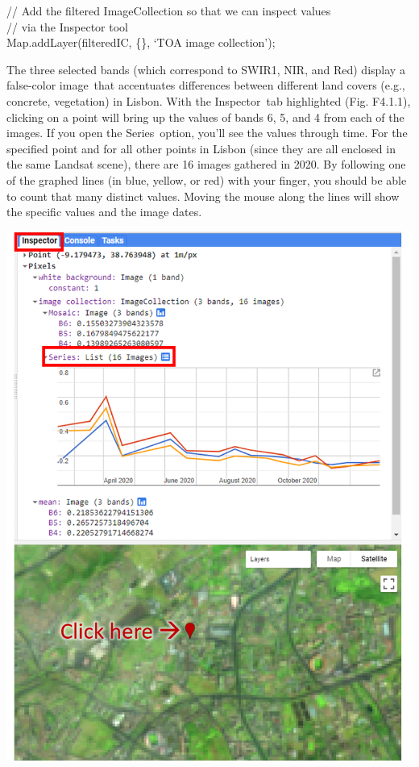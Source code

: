 \documentclass[
  letterpaper,
  DIV=11,
  numbers=noendperiod]{scrreprt}
\begin{document}
// Add the filtered ImageCollection so that we can inspect values\\
// via the Inspector tool\\
Map.addLayer(filteredIC, \{\}, `TOA image collection');

The three selected bands (which correspond to SWIR1, NIR, and Red)
display a false-color image~that accentuates differences between
different land covers (e.g., concrete, vegetation) in Lisbon. With the
Inspector~tab highlighted (Fig. F4.1.1), clicking on a point will bring
up the values of bands 6, 5, and 4 from each of the images. If you open
the Series~option, you'll see the values through time. For the specified
point and for all other points in Lisbon (since they are all enclosed in
the same Landsat scene), there are 16 images gathered in 2020. By
following one of the graphed lines (in blue, yellow, or red) with your
finger, you should be able to count that many distinct values. Moving
the mouse along the lines will show the specific values and the image
dates.

\includegraphics{./F4/image22.png}
\end{document}
